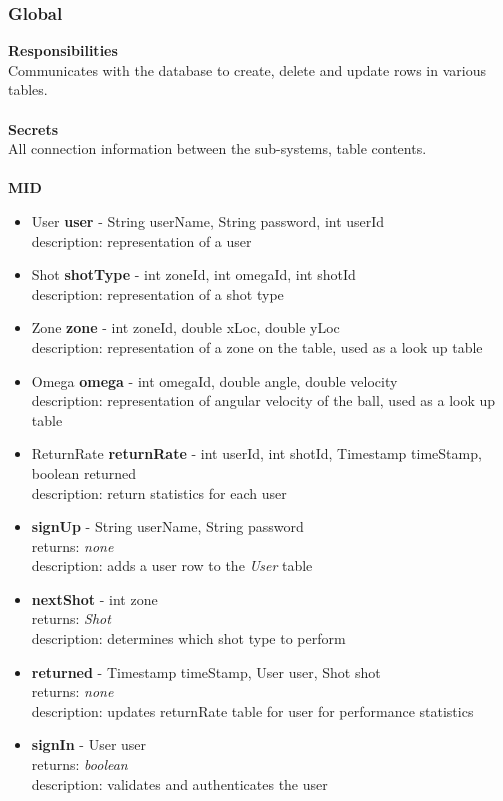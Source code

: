 \documentclass[11pt]{article}
\begin{document}
\subsubsection*{Global}
\textbf{Responsibilities} \\
Communicates with the database to create, delete and update rows in various tables.  \\ \\
\textbf{Secrets} \\
All connection information between the sub-systems, table contents.\\ \\
\textbf{MID} \\
\begin{itemize}
\item User \textbf{user} - String userName, String password, int userId \\ description: representation of a user
\item Shot \textbf{shotType} - int zoneId, int omegaId, int shotId \\ description: representation of a shot type
\item Zone \textbf{zone} -  int zoneId, double xLoc, double yLoc \\ description: representation of a zone on the table, used as a look up table
\item Omega \textbf{omega} - int omegaId, double angle, double velocity \\ description: representation of angular velocity of the ball, used as a look up table
\item ReturnRate \textbf{returnRate} - int userId, int shotId,  Timestamp timeStamp, boolean returned \\ description: return statistics for each user
\item \textbf{signUp} - String userName, String password \\ returns: \textit{none} \\ description: adds a user row to the \textit{User} table
\item \textbf{nextShot} - int zone \\ returns: \textit{Shot} \\ description: determines which shot type to perform
\item \textbf{returned} - Timestamp timeStamp, User user, Shot shot \\ returns: \textit{none} \\ description: updates returnRate table for user for performance statistics
\item \textbf{signIn} - User user \\ returns: \textit{boolean} \\ description: validates and authenticates the user

\end{itemize}
\end{document}
